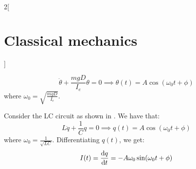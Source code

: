 \documentclass[../../../main_physics.tex]{subfiles}
\begin{document}
\begin{multicols}{2}[\section{Classical mechanics}]
\begin{proposition}
    $$\ddot{\theta}+\frac{mgD}{I_e}\theta=0\implies\theta(t)=A\cos(\omega_0t+\phi)$$ where $\omega_0=\sqrt{\frac{mgD}{I_e}}$.
    \begin{center}
      \begin{minipage}{\linewidth}
        \centering
        
        \label{CM_fig3}
      \end{minipage}
    \end{center}
  \end{proposition}
  \begin{proposition}
    Consider the LC circuit as shown in . We have that:
    $$L\ddot{q}+\frac{1}{C}q=0\implies q(t)=A\cos(\omega_0t+\phi)$$ where $\omega_0=\frac{1}{\sqrt{LC}}$. Differentiating $q(t)$, we get: $$I(t)=\dv{q}{t}=-A\omega_0\sin(\omega_0t+\phi)$$
    \begin{center}
      \begin{minipage}{\linewidth}
        \centering
        
        \label{CM_LC}
      \end{minipage}
    \end{center}
  \end{proposition}

\end{multicols}
\end{document}
